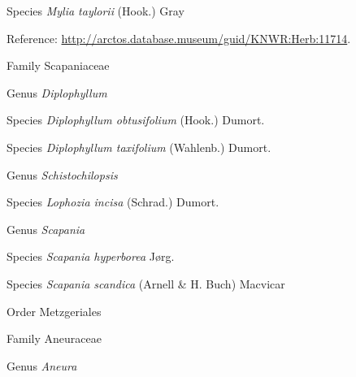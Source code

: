 \documentclass[9pt, article]{memoir}
\begin{document}
\begin{multicols}{2}
\vspace{6pt}\noindent\hspace{36pt}Species \textit{Mylia taylorii} (Hook.) Gray


\vspace{6pt}Reference: 
\url{http://arctos.database.museum/guid/KNWR:Herb:11714}.

\vspace{6pt}\noindent\hspace{24pt}Family Scapaniaceae


\vspace{6pt}\noindent\hspace{30pt}Genus \textit{Diplophyllum}


\vspace{6pt}\noindent\hspace{36pt}Species \textit{Diplophyllum obtusifolium} (Hook.) Dumort.


\vspace{6pt}\noindent\hspace{36pt}Species \textit{Diplophyllum taxifolium} (Wahlenb.) Dumort.


\vspace{6pt}\noindent\hspace{30pt}Genus \textit{Schistochilopsis}


\vspace{6pt}\noindent\hspace{36pt}Species \textit{Lophozia incisa} (Schrad.) Dumort.


\vspace{6pt}\noindent\hspace{30pt}Genus \textit{Scapania}


\vspace{6pt}\noindent\hspace{36pt}Species \textit{Scapania hyperborea} Jørg.


\vspace{6pt}\noindent\hspace{36pt}Species \textit{Scapania scandica} (Arnell \& H. Buch) Macvicar


\vspace{6pt}\noindent\hspace{18pt}Order Metzgeriales


\vspace{6pt}\noindent\hspace{24pt}Family Aneuraceae


\vspace{6pt}\noindent\hspace{30pt}Genus \textit{Aneura}



\end{multicols}
\end{document}
